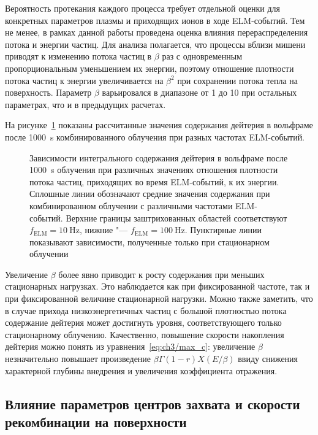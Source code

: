 Вероятность протекания каждого процесса требует отдельной оценки для конкретных параметров плазмы и приходящих ионов в ходе ELM-событий. Тем не менее, в рамках данной работы проведена оценка влияния перераспределения потока и энергии частиц. Для анализа полагается, что процессы вблизи мишени приводят к изменению потока частиц в \( \beta \) раз с одновременным пропорциональным уменьшением их энергии, поэтому отношение плотности потока частиц к энергии увеличивается на $\beta^2$ при сохранении потока тепла на поверхность. Параметр $\beta$ варьировался в диапазоне от 1 до 10 при остальных параметрах, что и в предыдущих расчетах. 

На рисунке~\cref{fig:ch3/beta_var} показаны рассчитанные значения содержания дейтерия в вольфраме после \SI{1000}{\second} комбинированного облучения при разных частотах ELM-событий. 
\begin{figure}[ht]
	\caption{Зависимости интегрального содержания дейтерия в вольфраме после \SI{1000}{\second} облучения при различных значениях отношения плотности потока частиц, приходящих во время ELM-событий, к их энергии. Сплошные линии обозначают средние значения содержания при комбинированном облучении с различными частотами ELM-событий. Верхние границы заштрихованных областей соответствуют \(f_\mathrm{ELM} = \SI{10}{\hertz}\), нижние "--- \(f_\mathrm{ELM} = \SI{100}{\hertz}\). Пунктирные линии показывают зависимости, полученные только при стационарном облучении}\label{fig:ch3/beta_var}
\end{figure}
Увеличение $\beta$ более явно приводит к росту содержания при меньших стационарных нагрузках. Это наблюдается как при фиксированной частоте, так и при фиксированной величине стационарной нагрузки. Можно также заметить, что в случае прихода низкоэнергетичных частиц с большой плотностью потока содержание дейтерия может достигнуть уровня, соответствующего только стационарному облучению. Качественно, повышение скорости накопления дейтерия можно понять из уравнения~\cref{eq:ch3/max_c}: увеличение $\beta$ незначительно повышает произведение $\beta\Gamma (1-r) X(E/\beta)$ ввиду снижения характерной глубины внедрения и увеличения коэффициента отражения. 

\subsection{Влияние параметров центров захвата и скорости рекомбинации на поверхности}

